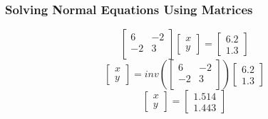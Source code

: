 \subsubsection*{Solving Normal Equations Using Matrices}
\[
\begin{bmatrix}
6 & -2 \\ 
-2 & 3 \\
\end{bmatrix}
\begin{bmatrix}
x \\ y
\end{bmatrix}
= 
\begin{bmatrix}
6.2 \\ 1.3
\end{bmatrix}
\]
\[
\begin{bmatrix}
x \\ y
\end{bmatrix}
= 
inv\left(
\begin{bmatrix}
6 & -2 \\ 
-2 & 3 \\
\end{bmatrix}
\right)
\begin{bmatrix}
6.2 \\ 1.3
\end{bmatrix}
\]
\[
\begin{bmatrix}
x \\ y
\end{bmatrix}
= 
\begin{bmatrix}
1.514 \\ 1.443
\end{bmatrix}
\]
